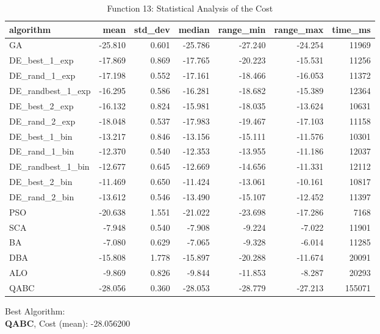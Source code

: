 \documentclass[12pt]{article}
\begin{document}
\begin{table}[H]
    \centering
    \footnotesize
    \begin{adjustbox}{width=1\textwidth}
\begin{tabular}{lrrrrrr}
\toprule
         algorithm &    mean &  std\_dev &  median &  range\_min &  range\_max &  time\_ms \\
\midrule
                GA & -25.810 &    0.601 & -25.786 &    -27.240 &    -24.254 &    11969 \\
     DE\_best\_1\_exp & -17.869 &    0.869 & -17.765 &    -20.223 &    -15.531 &    11256 \\
     DE\_rand\_1\_exp & -17.198 &    0.552 & -17.161 &    -18.466 &    -16.053 &    11372 \\
 DE\_randbest\_1\_exp & -16.295 &    0.586 & -16.281 &    -18.682 &    -15.389 &    12364 \\
     DE\_best\_2\_exp & -16.132 &    0.824 & -15.981 &    -18.035 &    -13.624 &    10631 \\
     DE\_rand\_2\_exp & -18.048 &    0.537 & -17.983 &    -19.467 &    -17.103 &    11158 \\
     DE\_best\_1\_bin & -13.217 &    0.846 & -13.156 &    -15.111 &    -11.576 &    10301 \\
     DE\_rand\_1\_bin & -12.370 &    0.540 & -12.353 &    -13.955 &    -11.186 &    12037 \\
 DE\_randbest\_1\_bin & -12.677 &    0.645 & -12.669 &    -14.656 &    -11.331 &    12112 \\
     DE\_best\_2\_bin & -11.469 &    0.650 & -11.424 &    -13.061 &    -10.161 &    10817 \\
     DE\_rand\_2\_bin & -13.612 &    0.546 & -13.490 &    -15.107 &    -12.452 &    11397 \\
               PSO & -20.638 &    1.551 & -21.022 &    -23.698 &    -17.286 &     7168 \\
               SCA &  -7.948 &    0.540 &  -7.908 &     -9.224 &     -7.022 &    11901 \\
                BA &  -7.080 &    0.629 &  -7.065 &     -9.328 &     -6.014 &    11285 \\
               DBA & -15.808 &    1.778 & -15.897 &    -20.288 &    -11.674 &    20091 \\
               ALO &  -9.869 &    0.826 &  -9.844 &    -11.853 &     -8.287 &    20293 \\
              QABC & -28.056 &    0.360 & -28.053 &    -28.779 &    -27.213 &   155071 \\
\bottomrule
\end{tabular}


    \end{adjustbox}
    \caption{Function 13: Statistical Analysis of the Cost} 
    \end{table}
Best Algorithm: \\
\textbf{QABC}, Cost (mean): -28.056200\\
\newpage
\end{document}
